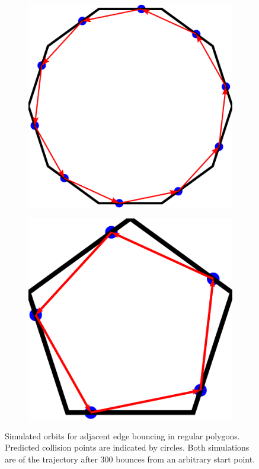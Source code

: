 \documentclass[letterpaper, 10 pt, conference]{ieeeconf}  %
\begin{document}
\begin{figure}[th]
\begin{subfigure}{.25\textwidth}
\centering

\includegraphics[width=0.7\linewidth]{figs/dec_limit_0pt2.pdf}

\end{subfigure}%
\begin{subfigure}{0.25\textwidth}

\includegraphics[width=0.7\linewidth]{figs/pent_limit_0pt5.pdf}

\end{subfigure}

\caption{Simulated orbits for adjacent edge bouncing in
regular polygons. Predicted collision points are indicated by circles. Both simulations are of the trajectory after 300 bounces
from an arbitrary start point. \label{prediction}}
\end{figure}
\end{document}
